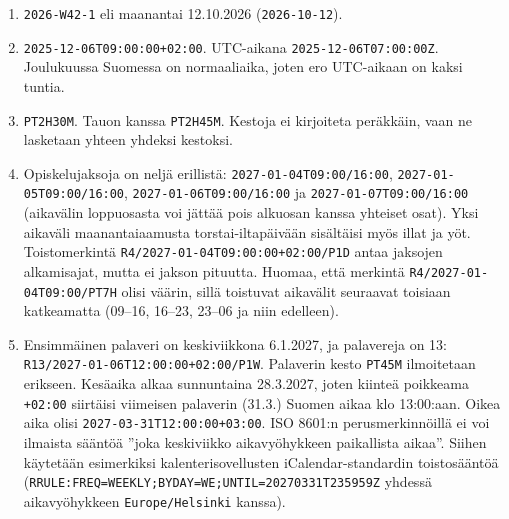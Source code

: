 \documentclass[
  finnish,
  letterpaper,
  DIV=11,
  numbers=noendperiod,
  oneside]{scrreprt}
\providecommand{\tightlist}{%
  \setlength{\itemsep}{0pt}\setlength{\parskip}{0pt}}
\begin{document}
\begin{tcolorbox}[enhanced jigsaw, arc=.35mm, bottomrule=.15mm, bottomtitle=1mm, breakable, colback=white, colbacktitle=quarto-callout-tip-color!10!white, colframe=quarto-callout-tip-color-frame, coltitle=black, left=2mm, leftrule=.75mm, opacityback=0, opacitybacktitle=0.6, rightrule=.15mm, title=\textcolor{quarto-callout-tip-color}{\faLightbulb}\hspace{0.5em}{Malliratkaisu}, titlerule=0mm, toprule=.15mm, toptitle=1mm]

\begin{enumerate}
\def\labelenumi{\arabic{enumi}.}
\tightlist
\item
  \texttt{2026-W42-1} eli maanantai 12.10.2026 (\texttt{2026-10-12}).
\item
  \texttt{2025-12-06T09:00:00+02:00}. UTC-aikana
  \texttt{2025-12-06T07:00:00Z}. Joulukuussa Suomessa on normaaliaika,
  joten ero UTC-aikaan on kaksi tuntia.
\item
  \texttt{PT2H30M}. Tauon kanssa \texttt{PT2H45M}. Kestoja ei kirjoiteta
  peräkkäin, vaan ne lasketaan yhteen yhdeksi kestoksi.
\item
  Opiskelujaksoja on neljä erillistä: \texttt{2027-01-04T09:00/16:00},
  \texttt{2027-01-05T09:00/16:00}, \texttt{2027-01-06T09:00/16:00} ja
  \texttt{2027-01-07T09:00/16:00} (aikavälin loppuosasta voi jättää pois
  alkuosan kanssa yhteiset osat). Yksi aikaväli maanantaiaamusta
  torstai-iltapäivään sisältäisi myös illat ja yöt. Toistomerkintä
  \texttt{R4/2027-01-04T09:00:00+02:00/P1D} antaa jaksojen alkamisajat,
  mutta ei jakson pituutta. Huomaa, että merkintä
  \texttt{R4/2027-01-04T09:00/PT7H} olisi väärin, sillä toistuvat
  aikavälit seuraavat toisiaan katkeamatta (09--16, 16--23, 23--06 ja
  niin edelleen).
\item
  Ensimmäinen palaveri on keskiviikkona 6.1.2027, ja palavereja on 13:
  \texttt{R13/2027-01-06T12:00:00+02:00/P1W}. Palaverin kesto
  \texttt{PT45M} ilmoitetaan erikseen. Kesäaika alkaa sunnuntaina
  28.3.2027, joten kiinteä poikkeama \texttt{+02:00} siirtäisi viimeisen
  palaverin (31.3.) Suomen aikaa klo 13:00:aan. Oikea aika olisi
  \texttt{2027-03-31T12:00:00+03:00}. ISO 8601:n perusmerkinnöillä ei
  voi ilmaista sääntöä ''joka keskiviikko aikavyöhykkeen paikallista
  aikaa''. Siihen käytetään esimerkiksi kalenterisovellusten
  iCalendar-standardin toistosääntöä
  (\texttt{RRULE:FREQ=WEEKLY;BYDAY=WE;UNTIL=20270331T235959Z} yhdessä
  aikavyöhykkeen \texttt{Europe/Helsinki} kanssa).
\end{enumerate}

\end{tcolorbox}
\end{document}
